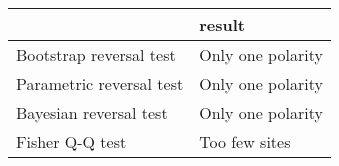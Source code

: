 \begin{tabular}{ll}
\toprule
{} &             result \\
\midrule
Bootstrap reversal test  &  Only one polarity \\
Parametric reversal test &  Only one polarity \\
Bayesian reversal test   &  Only one polarity \\
Fisher Q-Q test          &      Too few sites \\
\bottomrule
\end{tabular}
